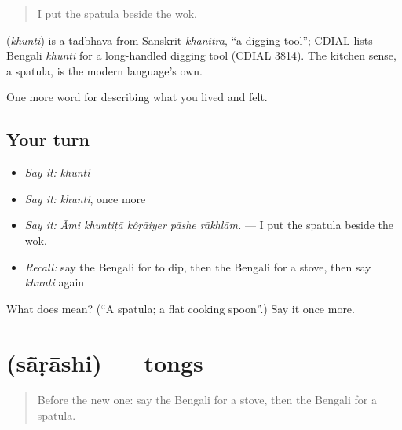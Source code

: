 \begin{quote}
I put the spatula beside the wok.
\end{quote}

\begin{cousinweb}
\textbf{} (\emph{khunti}) is a tadbhava from Sanskrit \emph{khanitra}, \textquotedblleft{}a digging tool\textquotedblright{}; CDIAL lists Bengali \emph{khunti} for a long-handled digging tool (CDIAL 3814). The kitchen sense, a spatula, is the modern language's own.
\end{cousinweb}

\begin{grammarlens}[title={What you've built}]
One more word for describing what you lived and felt.
\end{grammarlens}

\subsection*{Your turn}
\begin{itemize}
\raggedright
  \item \emph{Say it:} \emph{khunti}
  \item \emph{Say it:} \emph{khunti}, once more
  \item \emph{Say it:} \emph{Āmi khuntiṭā kôṛāiyer pāshe rākhlām.} — I put the spatula beside the wok.
  \item \emph{Recall:} say the Bengali for to dip, then the Bengali for a stove, then say \emph{khunti} again
\end{itemize}

\begin{tcolorbox}[breakable,colback=teal!4,colframe=teal!35!black,title={Before you move on}]
What does  mean? (\textquotedblleft{}A spatula; a flat cooking spoon\textquotedblright{}.) Say it once more.
\end{tcolorbox}
\section[\texorpdfstring{\bn{সাঁড়াশি} (sā̃ṛāshi)}{সাঁড়াশি (sā̃ṛāshi)}]{ (sā̃ṛāshi) — tongs}

\label{lesson:BN-C512-sarashi}



\begin{quote}
Before the new one: say the Bengali for a stove, then the Bengali for a spatula.
\end{quote}

